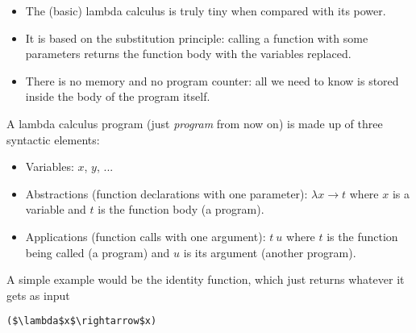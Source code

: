 \documentclass{beamer}
\begin{document}
\begin{frame}[fragile]{\CurrentSection}
\begin{block}{\CurrentSubSection}
\begin{itemize}
\item The (basic) lambda calculus is truly tiny when compared with its power.
\item It is based on the substitution principle: calling a function with some parameters returns the function body with the variables replaced.
\item There is no memory and no program counter: all we need to know is stored inside the body of the program itself.

\end{itemize}

\end{block}


\end{frame}

\begin{frame}[fragile]{\CurrentSection}
\begin{exampleblock}{}
A lambda calculus program (just \textit{program} from now on) is made up of three syntactic elements:
\end{exampleblock}

 
\begin{exampleblock}{}
\begin{itemize}
\item Variables: $x$, $y$, ...
\item Abstractions (function declarations with one parameter): $\lambda x\rightarrow t$ where $x$ is a variable and $t$ is the function body (a program).
\item Applications (function calls with one argument): $t\ u$ where $t$ is the function being called (a program) and $u$ is its argument (another program).

\end{itemize}

\end{exampleblock}

 

\end{frame}

\begin{frame}[fragile]{\CurrentSection}
\begin{exampleblock}{}
A simple example would be the identity function, which just returns whatever it gets as input
\end{exampleblock}

 
\lstset{basicstyle=\ttfamily\small}\lstset{numbers=none}\lstset{language=ML}\begin{lstlisting}
($\lambda$x$\rightarrow$x)
\end{lstlisting}
 

\end{frame}
\end{document}
